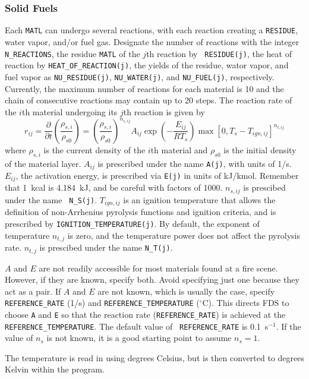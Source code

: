 \documentclass[11pt]{book}
\newcommand{\ct}{\tt\small}
\newcommand{\dod}[2]{\frac{\partial #1}{\partial #2}}
\newcommand{\be}{\begin{equation}}
\newcommand{\ee}{\end{equation}}
\begin{document}
\subsubsection{Solid Fuels}

Each {\ct MATL} can undergo several reactions, with each
reaction creating a {\ct RESIDUE}, water vapor, and/or fuel
gas. Designate the number of reactions with the integer {\ct
N\_REACTIONS}, the residue {\ct MATL} of the $j$th reaction by {\ct
RESIDUE(j)}, the heat of reaction by {\ct HEAT\_OF\_REACTION(j)}, the
yields of the residue, wator vapor, and fuel vapor as
{\ct NU\_RESIDUE(j)}, {\ct NU\_WATER(j)}, and {\ct NU\_FUEL(j)},
respectively. Currently, the maximum number of reactions for each
material is 10 and the chain of consecutive reactions may contain up
to 20 steps. The reaction rate of the $i$th material undergoing its
$j$th reaction is given by
\be
  r_{ij} =
  \dod{ }{t} \left( \frac{\rho_{s,i}}{\rho_{s0}} \right) =
  \left(\frac{\rho_{s,i}}{\rho_{s0}} \right)^{n_{s,ij}}
  A_{ij} \exp\left(-\frac{E_{ij}}{RT_s} \right)
  \max\left[0,T_s-T_{ign,ij}\right]^{n_{t,ij}}  \label{rr}
\ee
where $\rho_{s,i}$ is the current density of the $i$th material and
$\rho_{s0}$ is the initial density of the material layer.
$A_{ij}$ is prescribed under the name {\ct A(j)}, with units of
1/s. $E_{ij}$, the activation energy, is prescribed via {\ct E(j)} in
units of kJ/kmol. Remember that 1~kcal is 4.184~kJ, and be careful
with factors of 1000. $n_{s,ij}$ is prescibed under the name {\ct
N\_S(j)}. $T_{ign,ij}$ is an ignition temperature that
allows the definition of non-Arrhenius pyrolysis functions and
ignition criteria, and is prescribed by {\ct IGNITION\_TEMPERATURE(j)}.
By default, the exponent of temperature $n_{t,j}$ is zero, and the
temperature power does not affect the pyrolysis rate. $n_{t,j}$ is
prescibed under the name {\ct N\_T(j)}.

$A$ and $E$  are not readily accessible for most materials found at a
fire scene. However, if they are known, specify both. Avoid specifying
just one because they act as a pair.  If $A$ and $E$ are not known,
which is usually the case, specify {\ct REFERENCE\_RATE} (1/s) and
{\ct REFERENCE\_TEMPERATURE} ($^\circ$C). This directs FDS to choose
{\ct A} and {\ct E} so that the reaction rate ({\ct REFERENCE\_RATE})
is achieved at the {\ct REFERENCE\_TEMPERATURE}. The default value of {\ct
REFERENCE\_RATE} is 0.1~s$^{-1}$. If the value of $n_s$ is not known,
it is a good starting point to assume $n_s=1$.
\begin{warning}
\noindent
The temperature is read in using degrees Celsius, but is then converted to
degrees Kelvin within the program.
\end{warning}
\end{document}
